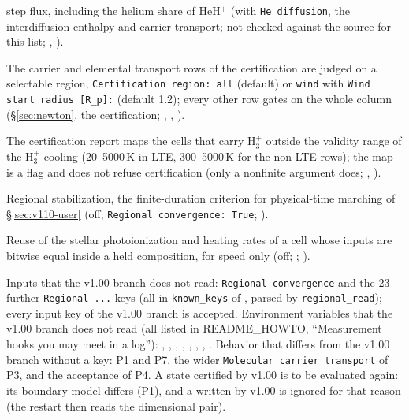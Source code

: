 \documentclass[english,a4paper]{my_memo}
\begin{document}
\begin{description}
  step flux, including the helium share of HeH$^+$ (with \texttt{He\_diffusion},
  the interdiffusion enthalpy and carrier transport; not checked against
  the source for this list; ,
  ).
\item[P6] The carrier and elemental transport rows of the certification are
  judged on a selectable region, \texttt{Certification region: all} (default)
  or \texttt{wind} with \texttt{Wind start radius [R\_p]:} (default 1.2);
  every other row gates on the whole column (\S\ref{sec:newton}, the
  certification; , ,
  ).
\item[P7] The certification report maps the cells that carry H$_3^+$ outside
  the validity range of the H$_3^+$ cooling (20--5000\,K in LTE, 300--5000\,K
  for the non-LTE rows); the map is a flag and does not refuse certification
  (only a nonfinite argument does; ,
  ).
\item[P8] Regional stabilization, the finite-duration criterion for
  physical-time marching of \S\ref{sec:v110-user} (off;
  \texttt{Regional convergence: True};
  ).
\item[P9] Reuse of the stellar photoionization and heating rates of a cell
  whose inputs are bitwise equal inside a held composition, for speed only
  (off; ;
  ).
\end{description}
Inputs that the v1.00 branch does not read: \texttt{Regional convergence}
and the 23 further \texttt{Regional ...} keys (all in \texttt{known\_keys} of
, parsed by \texttt{regional\_read}); every input key of
the v1.00 branch is accepted. Environment variables that the v1.00 branch
does not read (all listed in README\_HOWTO, ``Measurement hooks you may meet
in a log''):
, ,
, ,
, ,
, .
Behavior that differs from the v1.00 branch without a key: P1 and P7, the wider
\texttt{Molecular carrier transport} of P3, and the acceptance of P4. A state
certified by v1.00 is to be evaluated again: its boundary model differs (P1),
and a  written by v1.00 is ignored for that reason
(the restart then reads the dimensional pair).
\end{document}
